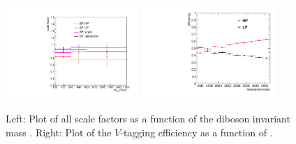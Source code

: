 \begin{figure}[htbp]
  \centering
  \includegraphics[width=0.45\textwidth]{fig/Vtag/MVVDepSummary.pdf}
  \includegraphics[width=0.45\textwidth]{fig/Vtag/ptDep.pdf}
  \caption{
    Left: Plot of all scale factors as a function of the diboson invariant mass \MVV.
    Right: Plot of the $V$-tagging efficiency as a function of \MVV.
  }
  \label{fig:VTag_massdep_summary}
\end{figure}
